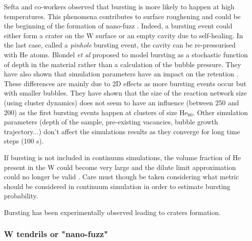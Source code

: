 Sefta and co-workers observed that bursting is more likely to happen at high temperatures.
This phenomena contributes to surface roughening and could be the beginning of the formation of nano-fuzz .
Indeed, a bursting event could either form a crater on the W surface or an empty cavity due to self-healing.
In the last case, called a \textit{pinhole} bursting event, the cavity can be re-pressurised with He atoms.
Blondel \textit{et al} proposed to model bursting as a stochastic function of depth in the material rather than a calculation of the bubble pressure.
They have also shown that simulation parameters have an impact on the retention .
These differences are mainly due to 2D effects as more bursting events occur but with smaller bubbles.
They have shown that the size of the reaction network size (using cluster dynamics) does not seem to have an influence (between 250 and 200) as the first bursting events happen at clusters of size $\text{He}_{80}$.
Other simulation parameters (depth of the sample, pre-existing vacancies, bubble growth trajectory...) don't affect the simulations results as they converge for long time steps (100 s).

If bursting is not included in continuum simulations, the volume fraction of He present in the W could become very large and the dilute limit approximation could no longer be valid .
Care must though be taken considering what metric should be considered in continuum simulation in order to estimate bursting probability.


Bursting has been experimentally observed  leading to craters formation.


\subsubsection{W tendrils or "nano-fuzz"}


